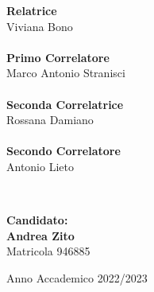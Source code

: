 \begin{titlepage}
{\begin{minipage}[t]{0.47\textwidth}
        {\large{\bf Relatrice}\\
            Viviana Bono}\\
        \vspace{4mm}
        \\
        {\large{\bf Primo Correlatore}\\
        Marco Antonio Stranisci\\
        }\\
        {\large{\bf Seconda Correlatrice}\\
        Rossana Damiano\\ 
        }\\
        {\large{\bf Secondo Correlatore}\\
        Antonio Lieto\\ 
        }
    \end{minipage}
    \\
    \null\hfill
    \begin{minipage}[t]{0.40\textwidth}
        \vspace{15mm}
        {\large{\bf Candidato:\\
                Andrea Zito \\ %
            } \large{Matricola 946885}} %
    \end{minipage}
    \vspace{10mm}
    \begin{center}
        {\large{Anno Accademico 2022/2023}}
    \end{center}
	}
\end{titlepage}
